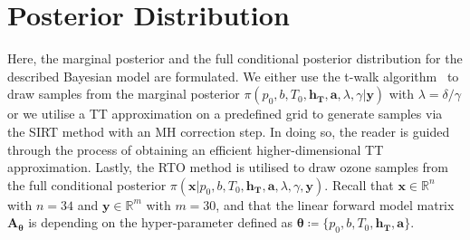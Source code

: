 \section{Posterior Distribution}
Here, the marginal posterior and the full conditional posterior distribution for the described Bayesian model are formulated.
We either use the t-walk algorithm~\cite{christen2010general} to draw samples from the marginal posterior $\pi(p_0,b,T_0,\bm{h_T},\bm{a} ,\lambda, \gamma| \bm{y})$ with $\lambda = \delta / \gamma$ or we utilise a TT approximation on a predefined grid to generate samples via the SIRT method with an MH correction step.
In doing so, the reader is guided through the process of obtaining an efficient  higher-dimensional TT approximation.
Lastly, the RTO method is utilised to draw ozone samples from the full conditional posterior $\pi(\bm{x}|p_0,b,T_0,\bm{h_T},\bm{a} ,\lambda, \gamma, \bm{y})$.
Recall that $\bm{x} \in \mathbb{R}^n$ with $n = 34$ and $\bm{y} \in \mathbb{R}^m$ with $m = 30$, and that the linear forward model matrix $\bm{A}_{\bm{\theta}}$ is depending on the hyper-parameter defined as $\bm{\theta}  \coloneqq \{p_0,b,T_0,\bm{h_T},\bm{a}  \}$.
